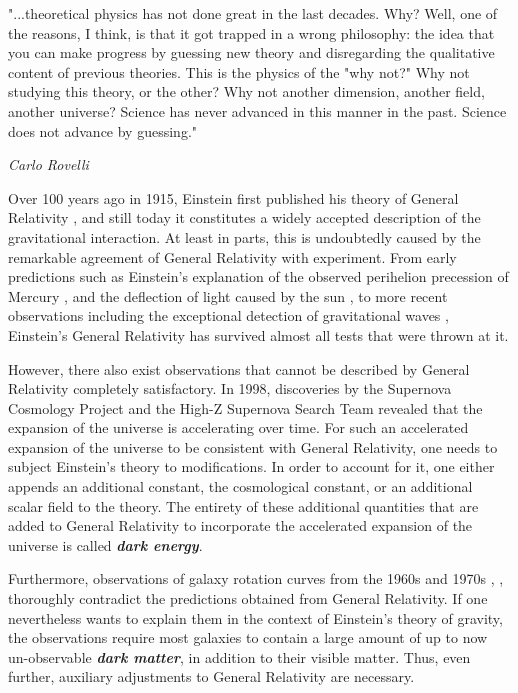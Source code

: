 \setlength{\epigraphwidth}{0.6\textwidth}
\epigraph{"...theoretical physics has not done great in the last decades. Why? Well, one of the reasons, I think, is that it got trapped in a wrong philosophy: the idea that you can make progress by guessing new theory and disregarding the qualitative content of previous theories. This is the physics of the "why not?" Why not studying this theory, or the other? Why not another dimension, another field, another universe? Science has never advanced in this manner in the past. Science does not advance by guessing."}{\textit{Carlo Rovelli}}

Over 100 years ago in 1915, Einstein first published his theory of General Relativity \cite{1915SPAW.......844E}, and still today it constitutes a widely accepted description of the gravitational interaction. 
At least in parts, this is undoubtedly caused by the remarkable agreement of General Relativity with experiment. 
From early predictions such as Einstein's explanation of the observed perihelion precession of Mercury \cite{Einst2}, and the deflection of light caused by the sun \cite{Will2006}, to more recent observations including the exceptional detection of gravitational waves \cite{2016PhRvL.116f1102A}, Einstein's General Relativity has survived almost all tests that were thrown at it.

However, there also exist observations that cannot be described by General Relativity completely satisfactory. In 1998, discoveries by the Supernova Cosmology Project \cite{1999ApJ...517..565P} and the High-Z Supernova Search Team \cite{1998AJ....116.1009R} revealed that the expansion of the universe is accelerating over time. For such an accelerated expansion of the universe to be consistent with General Relativity, one needs to subject Einstein's theory to modifications. In order to account for it, one either appends an additional constant, the cosmological constant, or an additional scalar field to the theory. The entirety of these additional quantities that are added to General Relativity to incorporate the accelerated expansion of the universe is called \textit{\textbf{dark energy}}.

Furthermore, observations of galaxy rotation curves from the 1960s and 1970s \cite{1970ApJ...160..811F}, \cite{1970ApJ...159..379R}, \cite{1980ApJ...238..471R} thoroughly contradict the predictions obtained from General Relativity. If one nevertheless wants to explain them in the context of Einstein's theory of gravity, the observations require most galaxies to contain a large amount of up to now un-observable \textit{\textbf{dark matter}}, in addition to their visible matter. Thus, even further, auxiliary adjustments to General Relativity are necessary. 

